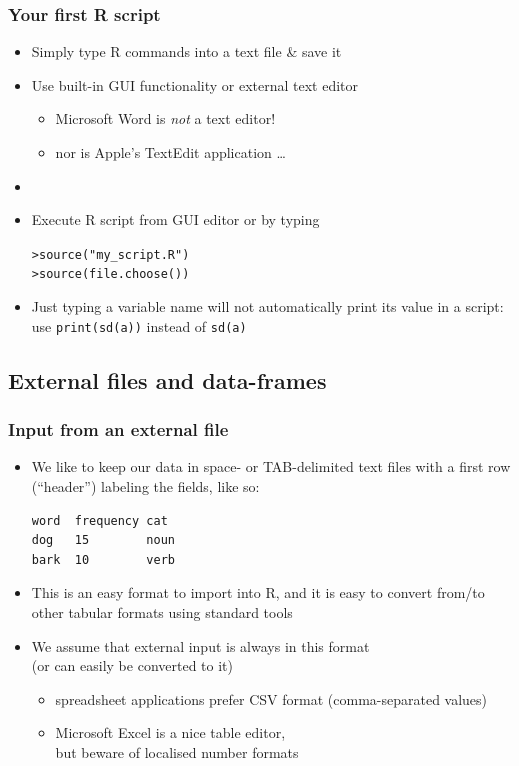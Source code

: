 \documentclass[t]{beamer} %
\begin{document}
\begin{frame}[fragile]
  \frametitle{Your first R script}

  \begin{itemize}
  \item Simply type R commands into a text file \& save it
  \item Use built-in GUI functionality or external text editor
    \begin{itemize}
    \item Microsoft Word is \emph{not} a text editor!
    \item nor is Apple's TextEdit application \ldots
    \end{itemize}
  \item[]
  \item Execute R script from GUI editor or by typing
    \begin{alltt}
> source("my_script.R") 
> source(file.choose()) 
    \end{alltt}
  \item Just typing a variable name will not automatically print its value in
    a script: use \verb_print(sd(a))_ instead of \verb_sd(a)_
  \end{itemize}
\end{frame}

\subsection{External files and data-frames}

\begin{frame}[fragile]
  \frametitle{Input from an external file}

  \begin{itemize}
  \item We like to keep our data in space- or TAB-delimited text files with a
    first row (``header'') labeling the fields, like so:
\begin{verbatim}
word  frequency cat
dog   15        noun
bark  10        verb 
\end{verbatim}
  \item This is an easy format to import into R, and it is easy to
    convert from/to other tabular formats using standard tools
  \item We assume that external input is always in this format\\ (or can
    easily be converted to it)
    \begin{itemize}
    \item spreadsheet applications prefer CSV format (comma-separated values)
    \item Microsoft Excel is a nice table editor,\\ but beware of localised
      number formats
    \end{itemize}
  \end{itemize}

\end{frame}
\end{document}
